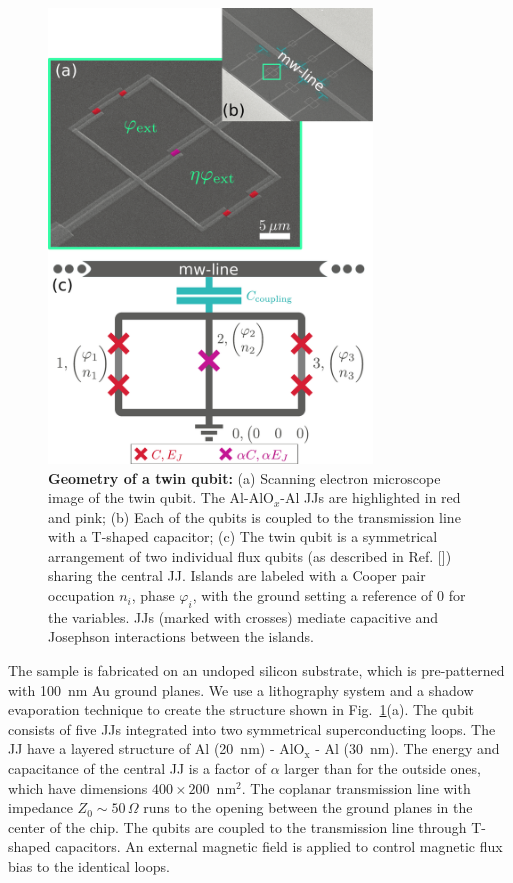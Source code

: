 \documentclass[%
reprint,
superscriptaddress,
bibnotes,
amsmath,
amssymb,
aps,
showkeys,
prb,
]{revtex4-2}
\begin{document}
\begin{figure}[htp]
\centering
  \includegraphics[width=8.6cm]{fig1}
  \caption{\small  \textbf{Geometry  of a  twin  qubit:}  (a) Scanning  electron
    microscope image of the twin qubit. The Al-AlO$_x$-Al JJs are highlighted in
    red and  pink; (b) Each  of the qubits is  coupled to the  transmission line
    with a T-shaped  capacitor; (c) The twin qubit is  a symmetrical arrangement
    of two individual  flux qubits (as described  in Ref. [\cite{Orlando_1999}]) sharing
    the central  JJ.  Islands are labeled  with a Cooper pair  occupation $n_i$,
    phase $\varphi_i$, with the  ground setting a reference of 0 for
    the variables.   JJs  (marked with  crosses)  mediate capacitive  and
    Josephson  interactions between  the islands.
  }
  \label{fig:setup}
\end{figure}

The sample is fabricated on an undoped silicon substrate, which is
pre-patterned with 100~nm Au ground planes. We  use a lithography 
system and a shadow evaporation  technique to create the structure shown in
Fig.~\ref{fig:setup}(a). The qubit consists of five JJs integrated into two
symmetrical  superconducting  loops. The  JJ  have  a   layered  structure  of
Al (20~nm) - AlO$_{\text{x}}$ - Al (30~nm).  The energy  and  capacitance of  the
central JJ  is a  factor of  $\alpha$ larger than  for the  outside ones,  which have
dimensions $400\times200$~nm$^2$.    The  coplanar  transmission   line  with
impedance $ Z_{0} \sim 50\,\Omega $ runs to the opening between the ground planes in the
center of the chip. The qubits are coupled to the transmission line
through T-shaped  capacitors.  An external magnetic field is applied to control magnetic flux bias to the identical loops.
\end{document}

